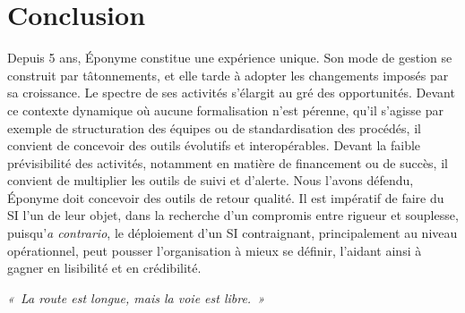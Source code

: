 \section*{Conclusion}

Depuis 5 ans, Éponyme constitue une expérience unique.
Son mode de gestion se construit par tâtonnements, et elle
tarde à adopter les changements imposés par sa croissance.
Le spectre de ses activités s'élargit au gré des opportunités.
Devant ce contexte dynamique où aucune formalisation n'est pérenne,
qu'il s'agisse par exemple de structuration des équipes ou de standardisation des procédés,
il convient de concevoir des outils évolutifs et interopérables.
Devant la faible prévisibilité des activités,
notamment en matière de financement ou de succès,
il convient de multiplier les outils de suivi et d'alerte.
Nous l'avons défendu, Éponyme doit concevoir des outils de retour qualité.
Il est impératif de faire du SI l'un de leur objet, dans la recherche
d'un compromis entre rigueur et souplesse, puisqu'\textit{a contrario},
le déploiement d'un SI contraignant, principalement au niveau opérationnel,
peut pousser l'organisation à mieux se définir,
l'aidant ainsi à gagner en lisibilité et en crédibilité.

\textit{«~La route est longue, mais la voie est libre.~»}